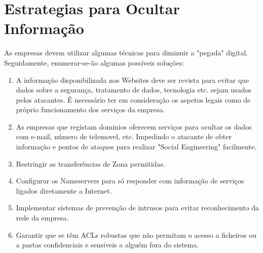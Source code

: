 \section{Estrategias para Ocultar Informação}

As empresas devem utilizar algumas técnicas para diminuir a "pegada" digital. Seguidamente, enumerar-se-ão algumas possíveis soluções:

\begin{enumerate}

\item A informação disponibilizada nos Websites deve ser revista para evitar que dados sobre a segurança, tratamento de dados, tecnologia etc. sejam usados pelos atacantes. É necessário ter em consideração os aspetos legais como de próprio funcionamento dos serviços da empresa.
\newline
\item As empresas que registam dominios oferecem serviços para ocultar os dados com e-mail, número de telemovel, etc. Impedindo o atacante de obter informação e pontos de ataques para realizar "Social Engineering" facilmente.
\newline
\item Restringir as transferências de Zona permitidas.
\newline
\item Configurar os Nameservers para só responder com informação de serviços ligados diretamente a Internet.
\newline
\item Implementar sistemas de prevenção de intrusos para evitar reconhecimento da rede da empresa.
\newline
\item Garantir que se têm ACLs robustas que não permitam o acesso a ficheiros ou a pastas confidenciais e sensiveis a alguém fora do sistema. 

\end{enumerate}

